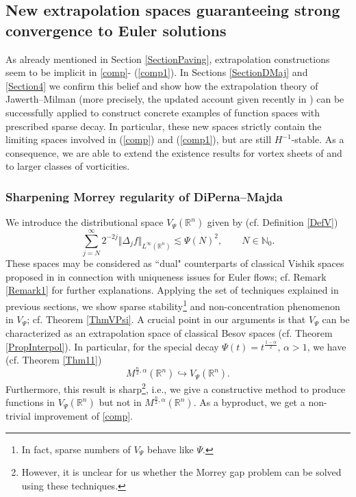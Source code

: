 \documentclass[11pt, a4paper,leqno]{amsart}
\theoremstyle{plain}
\numberwithin{equation}{section}
\theoremstyle{definition}
\theoremstyle{remark}
\def\R{\mathbb{R}}
\begin{document}
\subsection{New extrapolation spaces guaranteeing strong convergence to Euler solutions}
As already mentioned in Section \ref{SectionPaving}, extrapolation constructions seem to be implicit in \eqref{comp}- (\ref{comp1}).  In Sections \ref{SectionDMaj} and \ref{Section4} we confirm this belief and show how the extrapolation theory of Jawerth--Milman \cite{JM91} (more precisely,  the updated account given recently  in  \cite{DMEuler}) can be successfully applied to construct concrete
examples of function spaces with prescribed sparse decay. In particular, these new spaces 
strictly contain the limiting spaces involved in (\ref{comp}) and
(\ref{comp1}), but are still $H^{-1}$-stable. As a consequence, we are able to extend the existence results for vortex sheets of \cite{DiPernaMajda} and \cite{Tadmor} to larger classes of vorticities. 


\subsubsection{Sharpening Morrey regularity of DiPerna--Majda}\label{SecDM}

We introduce the distributional space $V_\Psi(\R^n)$ given by (cf. Definition \ref{DefV})
$$
\sum_{j=N}^{\infty}2^{-2j}\Vert\Delta_{j}f\Vert_{L^{\infty}(\mathbb{R}^{n}%
)}\lesssim\Psi(N)^{2}, \qquad N \in \mathbb{N}_0. 
$$
These spaces may be considered as ``dual" counterparts of  classical Vishik spaces proposed in \cite{V99} in connection with uniqueness issues for Euler flows; cf. Remark \ref{Remark1} for further explanations.  Applying the set of techniques explained in previous sections, we show sparse stability\footnote{In fact, sparse numbers of $V_\Psi$ behave like $\Psi$.} and non-concentration phenomenon in $V_\Psi$; cf. Theorem \ref{ThmVPsi}. A crucial point in our arguments is that $V_\Psi$ can be characterized as an extrapolation space of classical Besov spaces (cf. Theorem \ref{PropInterpol}). In particular, for the special decay $\Psi(t) = t^{\frac{1-\alpha}{2}}, \, \alpha > 1$, we have  (cf. Theorem \ref{Thm11})
$$M^{\frac{n}{2}, \alpha}(\R^n) \hookrightarrow V_\Psi(\R^n).$$
Furthermore, this result is sharp\footnote{However, it is unclear for us whether the Morrey gap problem can be solved using these techniques.}, i.e.,  we give a constructive method to produce functions  in $V_\Psi(\R^n)$ but not in $M^{\frac{n}{2}, \alpha}(\R^n)$. As a byproduct, we get a non-trivial improvement of \eqref{comp}.
\end{document}
